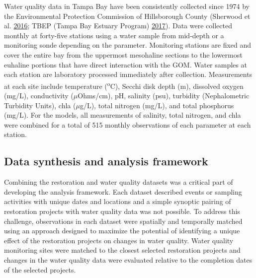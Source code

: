 \documentclass[]{article}
\begin{document}
Water quality data in Tampa Bay have been consistently collected since
1974 by the Environmental Protection Commission of Hillsborough County
(Sherwood et al. \protect\hyperlink{ref-Sherwood16}{2016}; TBEP (Tampa
Bay Estuary Program) \protect\hyperlink{ref-TBEP17}{2017}). Data were
collected monthly at forty-five stations using a water sample from
mid-depth or a monitoring sonde depending on the parameter. Monitoring
stations are fixed and cover the entire bay from the uppermost
mesohaline sections to the lowermost euhaline portions that have direct
interaction with the GOM. Water samples at each station are laboratory
processed immediately after collection. Measurements at each site
include temperature (\textsuperscript{o}C), Secchi disk depth (m),
dissolved oxygen (mg/L), conductivity (\(\mu\)Ohms/cm), pH, salinity
(psu), turbidity (Nephalometric Turbidity Units), \ac{chla}
(\(\mu\)g/L), total nitrogen (mg/L), and total phosphorus (mg/L). For
the models, all measurements of salinity, total nitrogen, and \ac{chla}
were combined for a total of 515 monthly observations of each parameter
at each station.

\hypertarget{data-synthesis-and-analysis-framework}{%
\subsection{Data synthesis and analysis
framework}\label{data-synthesis-and-analysis-framework}}

Combining the restoration and water quality datasets was a critical part
of developing the analysis framework. Each dataset described events or
sampling activities with unique dates and locations and a simple
synoptic pairing of restoration projects with water quality data was not
possible. To address this challenge, observations in each dataset were
spatially and temporally matched using an approach designed to maximize
the potential of identifying a unique effect of the restoration projects
on changes in water quality. Water quality monitoring sites were matched
to the closest selected restoration projects and changes in the water
quality data were evaluated relative to the completion dates of the
selected projects.
\end{document}
